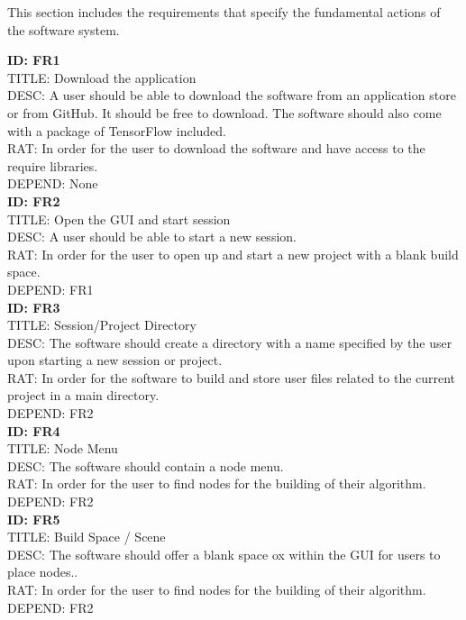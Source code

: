 \documentclass[journal,10pt,onecolumn,compsoc]{IEEEtran} \usepackage[margin=1.0in]{geometry} \usepackage{pdfpages} \usepackage{graphicx}
\begin{document}
This section includes the requirements that specify the fundamental actions of the software system.

\noindent
\textbf{ID: FR1}\\
TITLE: Download the application\\
DESC: A user should be able to download the software from an application store or from GitHub. It should be free to download. 
The software should also come with a package of TensorFlow included.\\
RAT: In order for the user to download the software and have access to the require libraries.\\
DEPEND: None\\

\noindent
\textbf{ID: FR2}\\
TITLE: Open the GUI and start session\\
DESC: A user should be able to start a new session. \\
RAT: In order for the user to open up and start a new project with a blank build space.\\
DEPEND: FR1\\

\noindent
\textbf{ID: FR3}\\
TITLE: Session/Project Directory\\
DESC: The software should create a directory with a name specified by the user upon starting a new session or project.\\
RAT: In order for the software to build and store user files related to the current project in a main directory.\\
DEPEND: FR2\\

\noindent
\textbf{ID: FR4}\\
TITLE: Node Menu\\
DESC: The software should contain a node menu.\\
RAT: In order for the user to find nodes for the building of their algorithm.\\
DEPEND: FR2\\

\noindent
\textbf{ID: FR5}\\
TITLE: Build Space / Scene\\
DESC: The software should offer a blank space ox within the GUI for users to place nodes..\\
RAT: In order for the user to find nodes for the building of their algorithm.\\
DEPEND: FR2\\
\end{document}
